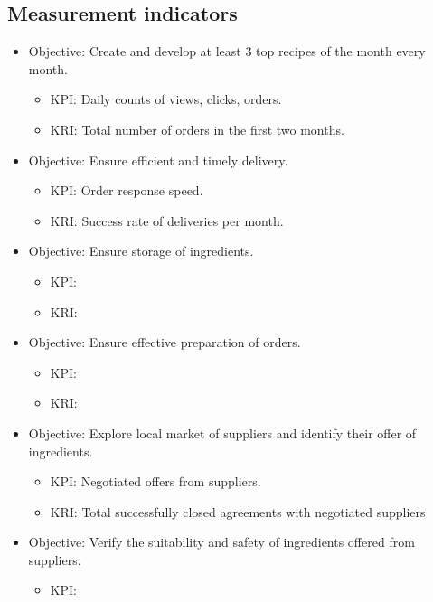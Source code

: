 \documentclass[11pt,a4paper]{article}
\begin{document}

\subsection{Measurement indicators}

\begin{itemize}
    \item Objective: Create and develop at least 3 top recipes of the month every month.
    \begin{itemize}
        \item KPI: Daily counts of views, clicks, orders.
        \item KRI: Total number of orders in the first two months.
    \end{itemize}
    \item Objective: Ensure efficient and timely delivery.
    \begin{itemize}
        \item KPI: Order response speed.
        \item KRI: Success rate of deliveries per month.
    \end{itemize}
    \item Objective: Ensure storage of ingredients.
    \begin{itemize}
        \item KPI: 
        \item KRI: 
    \end{itemize}
    \item Objective: Ensure effective preparation of orders.
    \begin{itemize}
        \item KPI: 
        \item KRI: 
    \end{itemize}
    \item Objective: Explore local market of suppliers and identify their offer of ingredients.
    \begin{itemize}
        \item KPI: Negotiated offers from suppliers.
        \item KRI: Total successfully closed agreements with negotiated suppliers
    \end{itemize}
    \item Objective: Verify the suitability and safety of ingredients offered from suppliers.
    \begin{itemize}
        \item KPI: 

\end{itemize}
\end{itemize}
\end{document}
